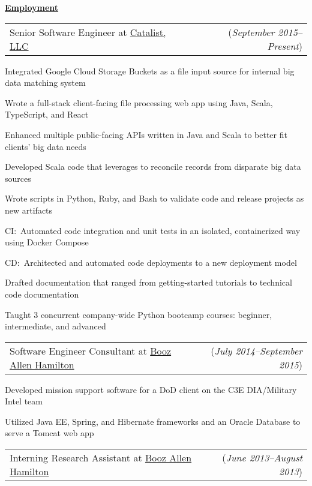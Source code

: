 \documentclass[11pt, letterpaper]{letter}
\makeatletter
\newlength{\indwidth}            \setlength{\indwidth}{\textwidth-.4in}
\newlength{\headerAntispace}     \setlength{\headerAntispace}{-6pt}
\newcommand{\dated}[2]{
    \begin{tabular*}{\indwidth}{l@{\extracolsep{\fill}}r}
        #1 & (\textit{#2})
    \end{tabular*}
}
\newcommand{\myul}[3]{
    \begingroup
        \renewcommand{\ULdepth}{#1}
        \renewcommand{\ULthickness}{#2}
        \uline{#3}
    \endgroup
}
\newcommand{\sectionheader}[1]{
    \myul{2.7pt}{0.5pt}{\large \textbf{#1}}
}
\newcommand{\CatalistLLC}{\href{https://catalist.us/}{Catalist, LLC}}
\newcommand{\BAH}{\href{https://www.boozallen.com/}{Booz Allen Hamilton}}
\makeatother
\begin{document}
\sectionheader{Employment}
\vspace{\headerAntispace}
\begin{compactitem}
    \item \dated{Senior Software Engineer at \CatalistLLC}{September 2015--Present}
        \begin{compactitem}
            \item Integrated Google Cloud Storage Buckets as a file input source for internal big data matching system
            \item Wrote a full-stack client-facing file processing web app using Java, Scala, TypeScript, and React
            \item Enhanced multiple public-facing APIs written in Java and Scala to better fit clients' big data needs
            \item Developed Scala code that leverages \Elasticsearch{} to reconcile records from disparate big data
                sources
            \item Wrote scripts in Python, Ruby, and Bash to validate code and release projects as new artifacts
            \item CI:\ Automated code integration and unit tests in an isolated, containerized way using Docker Compose
            \item CD:\ Architected and automated code deployments to a new \BlueGreen{} deployment model
            \item Drafted documentation that ranged from getting-started tutorials to technical code documentation
            \item Taught 3 concurrent company-wide Python bootcamp courses: beginner, intermediate, and advanced
        \end{compactitem}
    \item \dated{Software Engineer Consultant at \BAH}{July 2014--September 2015}
        \begin{compactitem}
            \item Developed mission support software for a DoD client on the C3E DIA/Military Intel team
            \item Utilized Java EE, Spring, and Hibernate frameworks and an Oracle Database to serve a Tomcat web app
        \end{compactitem}
    \item \dated{Interning Research Assistant at \BAH}{June 2013--August 2013}

\end{compactitem}
\end{document}
